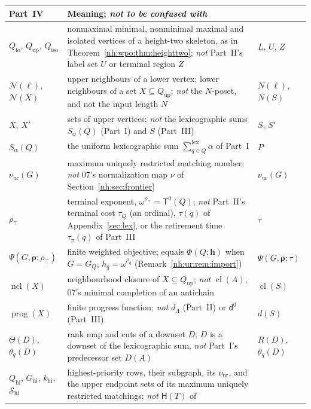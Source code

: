 \documentclass[11pt,a4paper]{article}
\theoremstyle{definition}
\theoremstyle{remark}
\newcommand{\mcl}{\operatorname{cl}}
\newcommand{\HH}{\mathsf H}
\newcommand{\Tz}{\mathsf T^{0}}
\newcommand{\lxsi}{\mathop{\textstyle\sum}\nolimits^{\mathrm{lex}}}
\newcommand{\Qlo}{Q_{\mathrm{lo}}}
\newcommand{\Qup}{Q_{\mathrm{up}}}
\newcommand{\Qiso}{Q_{\mathrm{iso}}}
\newcommand{\Qhi}{Q_{\mathrm{hi}}}
\newcommand{\Nb}{\mathcal N}
\newcommand{\nuur}{\nu_{\mathrm{ur}}}
\newcommand{\rtop}{\rho_{\top}}
\newcommand{\ncl}{\operatorname{ncl}}
\begin{document}
\begin{table}[htbp]
\centering\small
\renewcommand{\arraystretch}{1.15}
\begin{tabularx}{\linewidth}{@{}>{\raggedright\arraybackslash}p{.22\linewidth}>{\raggedright\arraybackslash}X>{\raggedright\arraybackslash}p{.12\linewidth}@{}}
\toprule
Part~IV & Meaning; \emph{not to be confused with} & 04\\
\midrule
$\Qlo$, $\Qup$, $\Qiso$ & nonmaximal minimal, nonminimal maximal and isolated
vertices of a height-two skeleton, as in Theorem~\ref{nh:wpo:thm:heighttwo};
\emph{not} Part~II's label set $U$ or terminal region $Z$ & $L$, $U$, $Z$\\
$\Nb(\ell)$, $\Nb(X)$ & upper neighbours of a lower vertex; lower neighbours
of a set $X\subseteq\Qup$; \emph{not} the $N$-poset, and not the input length
$N$ & $N(\ell)$, $N(S)$\\
$X$, $X'$ & sets of upper vertices; \emph{not} the lexicographic sums
$S_\alpha(Q)$ (Part~I) and $S$ (Part~III) & $S$, $S'$\\
$S_\alpha(Q)$ & the uniform lexicographic sum $\lxsi_{q\in Q}\alpha$ of
Part~I & $P$\\
$\nuur(G)$ & maximum uniquely restricted matching number; \emph{not} 07's
normalization map $\nu$ of Section~\ref{nh:sec:frontier} & $\nuur(G)$\\
$\rtop$ & terminal exponent, $\omega^{\rtop}=\Tz(Q)$; \emph{not} Part~II's
terminal cost $\tau_Q$ (an ordinal), $\tau(q)$ of Appendix~\ref{sec:lex}, or
the retirement time $\tau_\pi(q)$ of Part~III & $\tau$\\
$\Psi(G,\boldsymbol\rho;\rtop)$ & finite weighted objective; equals
$\Phi(Q;\boldsymbol h)$ when $G=G_Q$, $h_q=\omega^{\rho_q}$
(Remark~\ref{nh:ur:rem:import}) & $\Psi(G,\boldsymbol\rho;\tau)$\\
$\ncl(X)$ & neighbourhood closure of $X\subseteq\Qup$; \emph{not} $\mcl(A)$,
07's minimal completion of an antichain & $\operatorname{cl}(S)$\\
$\operatorname{prog}(X)$ & finite progress function; \emph{not} $d_\Lambda$
(Part~II) or $\mathsf d^0$ (Part~III) & $d(S)$\\
$\Theta(D)$, $\theta_q(D)$ & rank map and cuts of a downset $D$; $D$ is a
downset of the lexicographic sum, \emph{not} Part~I's predecessor set $D(A)$
& $R(D)$, $\theta_q(D)$\\
$\Qhi$, $G_{\mathrm{hi}}$, $k_{\mathrm{hi}}$, $\mathscr S_{\mathrm{hi}}$ &
highest-priority rows, their subgraph, its $\nuur$, and the upper endpoint
sets of its maximum uniquely restricted matchings; \emph{not} $\HH(T)$ of

\end{tabularx}
\end{table}
\end{document}
